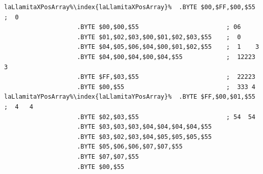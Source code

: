\begin{lstlisting}[escapechar=\%]
laLlamitaXPosArray%\index{laLlamitaXPosArray}%  .BYTE $00,$FF,$00,$55                    ;  0       
                    .BYTE $00,$00,$55                        ; 06      
                    .BYTE $01,$02,$03,$00,$01,$02,$03,$55    ;  0      
                    .BYTE $04,$05,$06,$04,$00,$01,$02,$55    ;  1    3 
                    .BYTE $04,$00,$04,$00,$04,$55            ;  12223 3
                    .BYTE $FF,$03,$55                        ;  22223  
                    .BYTE $00,$55                            ;  333 4  
laLlamitaYPosArray%\index{laLlamitaYPosArray}%  .BYTE $FF,$00,$01,$55                    ;  4   4  
                    .BYTE $02,$03,$55                        ; 54  54  
                    .BYTE $03,$03,$03,$04,$04,$04,$04,$55
                    .BYTE $03,$02,$03,$04,$05,$05,$05,$55
                    .BYTE $05,$06,$06,$07,$07,$55
                    .BYTE $07,$07,$55
                    .BYTE $00,$55

\end{lstlisting}


